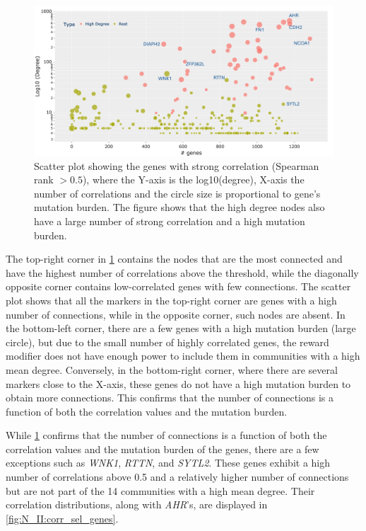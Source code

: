 \begin{figure}[!b]    
    \centering
    \includegraphics[width=1.0\textwidth,height=1.0\textheight,keepaspectratio]{Sections/Network_II/resources/reward/Degree_highCorrGenes_labeled.png}
    \caption[Number of connections vs their strength]{Scatter plot showing the genes with strong correlation (Spearman rank $>0.5$), where the Y-axis is the log10(degree), X-axis the number of correlations and the circle size is proportional to gene's mutation burden. The figure shows that the high degree nodes also have a large number of strong correlation and a high mutation burden. }
    \label{fig:N_II:degree_high_corr}
\end{figure}


The top-right corner in \cref{fig:N_II:degree_high_corr} contains the nodes that are the most connected and have the highest number of correlations above the threshold, while the diagonally opposite corner contains low-correlated genes with few connections. The scatter plot shows that all the markers in the top-right corner are genes with a high number of connections, while in the opposite corner, such nodes are absent. In the bottom-left corner, there are a few genes with a high mutation burden (large circle), but due to the small number of highly correlated genes, the reward modifier does not have enough power to include them in communities with a high mean degree. Conversely, in the bottom-right corner, where there are several markers close to the X-axis, these genes do not have a high mutation burden to obtain more connections. This confirms that the number of connections is a function of both the correlation values and the mutation burden.

While \cref{fig:N_II:degree_high_corr} confirms that the number of connections is a function of both the correlation values and the mutation burden of the genes, there are a few exceptions such as \textit{WNK1}, \textit{RTTN}, and \textit{SYTL2}. These genes exhibit a high number of correlations above 0.5 and a relatively higher number of connections but are not part of the 14 communities with a high mean degree. Their correlation distributions, along with \textit{AHR}'s, are displayed in \cref{fig:N_II:corr_sel_genes}. 


